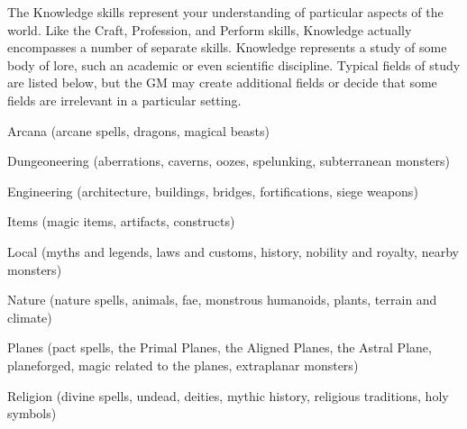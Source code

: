 \newpage
{}
  The Knowledge skills represent your understanding of particular aspects of the world.
  Like the Craft, Profession, and Perform skills, Knowledge actually encompasses a number of separate skills.
  Knowledge represents a study of some body of lore, such an academic or even scientific discipline.
  Typical fields of study are listed below, but the GM may create additional fields or decide that some fields are irrelevant in a particular setting.
  \begin{raggeditemize}
    \item Arcana (arcane spells, dragons, magical beasts)
    \item Dungeoneering (aberrations, caverns, oozes, spelunking, subterranean monsters)
    \item Engineering (architecture, buildings, bridges, fortifications, siege weapons)
    \item Items (magic items, artifacts, constructs)
    \item Local (myths and legends, laws and customs, history, nobility and royalty, nearby monsters)
    \item Nature (nature spells, animals, fae, monstrous humanoids, plants, terrain and climate)
    \item Planes (pact spells, the Primal Planes, the Aligned Planes, the Astral Plane,
      planeforged, magic related to the planes, extraplanar monsters)
    \item Religion (divine spells, undead, deities, mythic history, religious traditions, holy symbols)
  \end{raggeditemize}

